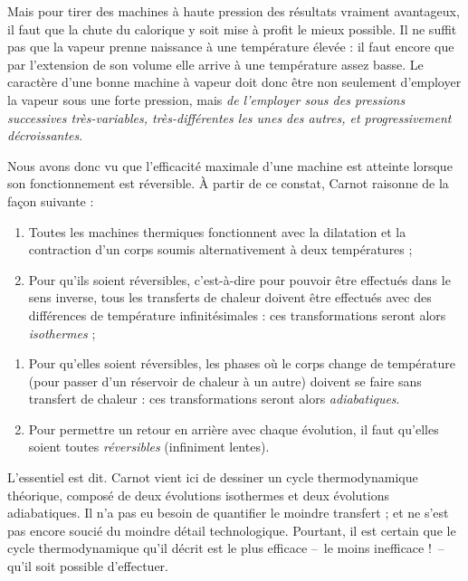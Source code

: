 			Mais pour tirer des machines à haute pression des résultats vraiment avantageux, il faut que la chute du calorique y soit mise à profit le mieux possible. Il ne suffit pas que la vapeur prenne naissance à une température élevée : il faut encore que par l’extension de son volume elle arrive à une température assez basse. Le caractère d’une bonne machine à vapeur doit donc être non seulement d’employer la vapeur sous une forte pression, mais \emph{de l’employer sous des pressions successives très-variables, très-différentes les unes des autres, et progressivement décroissantes}.
		
		Nous avons donc vu que l’efficacité maximale d’une machine est atteinte lorsque son fonctionnement est réversible. À partir de ce constat, Carnot raisonne de la façon suivante :

		\begin{enumerate}
			\item Toutes les machines thermiques fonctionnent avec la dilatation et la contraction d’un corps soumis alternativement à deux températures ;
			\item Pour qu’ils soient réversibles, c’est-à-dire pour pouvoir être effectués dans le sens inverse, tous les transferts de chaleur doivent être effectués avec des différences de température infinitésimales : ces transformations seront alors \emph{isothermes} ;
		\end{enumerate}\vspace{-0.7em}%
		
		\begin{enumerate}%
			\item Pour qu’elles soient réversibles, les phases où le corps change de température (pour passer d’un réservoir de chaleur à un autre) doivent se faire sans transfert de chaleur : ces transformations seront alors \emph{adiabatiques}.
			\item Pour permettre un retour en arrière avec chaque évolution, il faut qu’elles soient toutes \emph{réversibles} (infiniment lentes).
		\end{enumerate}

		L’essentiel est dit. Carnot vient ici de dessiner un cycle thermodynamique théorique, composé de deux évolutions isothermes et deux évolutions adiabatiques. Il n’a pas eu besoin de quantifier le moindre transfert ; et ne s’est pas encore soucié du moindre détail technologique. Pourtant, il est certain que le cycle thermodynamique qu’il décrit est le plus efficace --\ le moins inefficace !\ -- qu’il soit possible d’effectuer.
		

